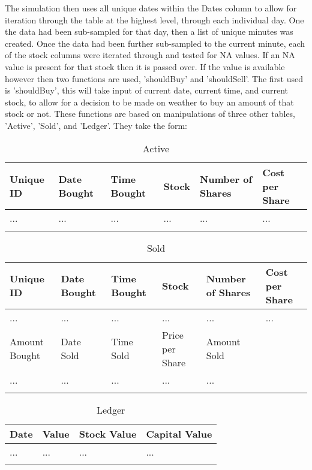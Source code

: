 \documentclass[12pt,a4paper]{article}
\begin{document}
The simulation then uses all unique dates within the Dates column to allow for iteration through the table at the highest level, through each individual day. One the data had been sub-sampled for that day, then a list of unique minutes was created. Once the data had been further sub-sampled to the current minute, each of the stock columns were iterated through and tested for NA values. If an NA value is present for that stock then it is passed over. If the value is available however then two functions are used, 'shouldBuy' and 'shouldSell'. The first used is 'shouldBuy', this will take input of current date, current time, and current stock, to allow for a decision to be made on weather to buy an amount of that stock or not. These functions are based on manipulations of three other tables, 'Active', 'Sold', and 'Ledger'. They take the form:

\label{units}
\begin{longtable}{ |p{2.25cm}|p{2.25cm}|p{2.25cm}|p{2.25cm}|p{2.25cm}|p{2.25cm}| }\hline\hline
Unique ID & Date Bought & Time Bought & Stock & Number of Shares & Cost per Share \\ \hline
... & ... & ... & ... & ... & ... \\ \hline
\caption{Active}
\end{longtable}

\label{units}
\begin{longtable}{ |p{2.25cm}|p{2.25cm}|p{2.25cm}|p{2.25cm}|p{2.25cm}|p{2.25cm}| }\hline\hline
Unique ID & Date Bought & Time Bought & Stock & Number of Shares & Cost per Share \\ \hline
... & ... & ... & ... & ... & ... \\ \hline
Amount Bought & Date Sold & Time Sold & Price per Share & Amount Sold & \\ \hline
... & ... & ... & ... & ... &  \\ \hline
\caption{Sold}
\end{longtable}

\label{units}
\begin{longtable}{ |p{2.25cm}|p{2.25cm}|p{2.25cm}|p{2.25cm}| }\hline\hline
Date & Value & Stock Value & Capital Value \\ \hline
... & ... & ... & ...  \\ \hline
\caption{Ledger}
\end{longtable}
\end{document}
